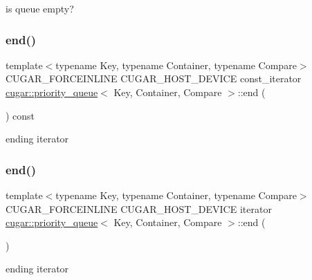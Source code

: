 is queue empty? \mbox{\label{structcugar_1_1priority__queue_a1ffb30afe7e85d8b1ccb10446cae678d}} 
\subsubsection{\texorpdfstring{end()}{end()}\hspace{0.1cm}{\footnotesize\ttfamily [1/2]}}
{\footnotesize\ttfamily template$<$typename Key, typename Container, typename Compare$>$ \\
C\+U\+G\+A\+R\+\_\+\+F\+O\+R\+C\+E\+I\+N\+L\+I\+NE C\+U\+G\+A\+R\+\_\+\+H\+O\+S\+T\+\_\+\+D\+E\+V\+I\+CE const\+\_\+iterator \hyperlink{structcugar_1_1priority__queue}{cugar\+::priority\+\_\+queue}$<$ Key, Container, Compare $>$\+::end (\begin{DoxyParamCaption}{ }\end{DoxyParamCaption}) const\hspace{0.3cm}{\ttfamily [inline]}}

ending iterator \mbox{\label{structcugar_1_1priority__queue_a2e23a349f2e9092a2fe0b1593a91f03a}} 
\subsubsection{\texorpdfstring{end()}{end()}\hspace{0.1cm}{\footnotesize\ttfamily [2/2]}}
{\footnotesize\ttfamily template$<$typename Key, typename Container, typename Compare$>$ \\
C\+U\+G\+A\+R\+\_\+\+F\+O\+R\+C\+E\+I\+N\+L\+I\+NE C\+U\+G\+A\+R\+\_\+\+H\+O\+S\+T\+\_\+\+D\+E\+V\+I\+CE iterator \hyperlink{structcugar_1_1priority__queue}{cugar\+::priority\+\_\+queue}$<$ Key, Container, Compare $>$\+::end (\begin{DoxyParamCaption}{ }\end{DoxyParamCaption})\hspace{0.3cm}{\ttfamily [inline]}}

ending iterator \mbox{\label{structcugar_1_1priority__queue_aaa3d4e418725e5c5442382b007f4bc13}} 
